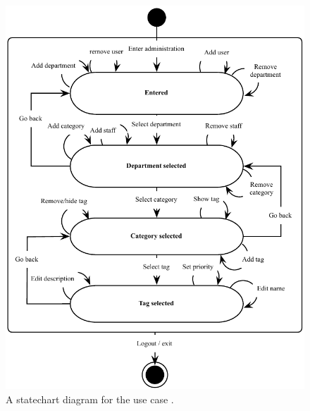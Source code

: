 \begin{figure}[h]
\begin{center}
 \includegraphics[scale=0.8]{input/application_domain_analysis/admin_use_case}
\caption{A statechart diagram for the use case \tucadmin{}.}
\label{fig:use_case_diagram}
\end{center}
\end{figure}